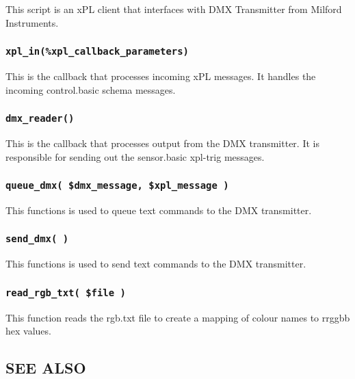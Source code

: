 \documentclass[12pt,a4paper]{article}
\begin{document}
This script is an xPL client that interfaces with DMX Transmitter from
Milford Instruments.

\subsubsection*{\texttt{xpl\_in(\%xpl\_callback\_parameters)}\label{xpl-dmx_xpl_in_xpl_callback_parameters_}}


This is the callback that processes incoming xPL messages.  It handles
the incoming control.basic schema messages.

\subsubsection*{\texttt{dmx\_reader()}\label{xpl-dmx_dmx_reader_}}


This is the callback that processes output from the DMX transmitter.
It is responsible for sending out the sensor.basic xpl-trig messages.

\subsubsection*{\texttt{queue\_dmx( \$dmx\_message, \$xpl\_message )}\label{xpl-dmx_queue_dmx_dmx_message_xpl_message_}}


This functions is used to queue text commands to the DMX transmitter.

\subsubsection*{\texttt{send\_dmx( )}\label{xpl-dmx_send_dmx_}}


This functions is used to send text commands to the DMX transmitter.

\subsubsection*{\texttt{read\_rgb\_txt( \$file )}\label{xpl-dmx_read_rgb_txt_file_}}


This function reads the rgb.txt file to create a mapping of colour names
to rrggbb hex values.

\subsection*{SEE ALSO\label{xpl-dmx_SEE_ALSO}}
\end{document}
